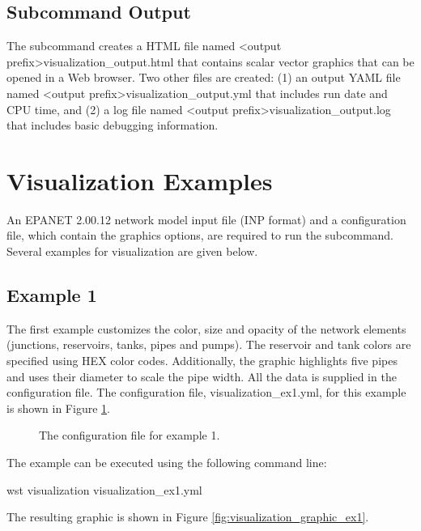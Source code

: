 \subsection{Subcommand Output}

The  subcommand creates a HTML file 
named <output prefix>visualization\_output.html
that contains scalar vector graphics that can be opened in a Web browser.  
Two other files are created: 
(1) an output YAML file named <output prefix>visualization\_output.yml
that includes run date and CPU time, and 
(2) a log file named <output prefix>visualization\_output.log
that includes basic debugging information.

\section{Visualization Examples}\label{visualization_example}

An EPANET 2.00.12 network model input file (INP format) and a configuration file, which contain the
graphics options, are required to run the  subcommand.  
Several examples for visualization are given below.

\subsection{Example 1}

The first example customizes the color, size and opacity of the network
elements (junctions, reservoirs, tanks, pipes and pumps). The reservoir and 
tank colors are specified using HEX color codes. Additionally, the graphic
highlights five pipes and uses their diameter to scale the pipe width. 
All the data is supplied in the configuration file.  
The configuration file, visualization\_ex1.yml, for this example is shown in Figure \ref{fig:visualization_ex1}.  

\begin{figure}[h]
  \caption{The  configuration file for example 1.}
  \label{fig:visualization_ex1}
\end{figure}

The example can be executed using the following command line:

\begin{unknownListing}
wst visualization visualization_ex1.yml
\end{unknownListing}

The resulting graphic is shown in Figure \ref{fig:visualization_graphic_ex1}.

